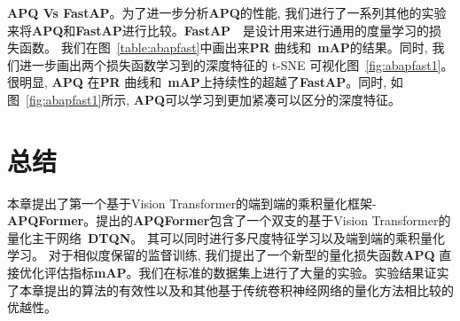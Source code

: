 \textbf{APQ Vs FastAP}。为了进一步分析\textbf{APQ}的性能, 我们进行了一系列其他的实验来将\textbf{APQ}和\textbf{FastAP}进行比较。\textbf{FastAP}~~\cite{cakir2019deep}是设计用来进行通用的度量学习的损失函数。 我们在图~\ref{table:abapfast}中画出来\textbf{PR} 曲线和~\textbf{mAP}的结果。同时, 我们进一步画出两个损失函数学习到的深度特征的 t-SNE 可视化图~\ref{fig:abapfast1}。很明显, \textbf{APQ} 在\textbf{PR} 曲线和~\textbf{mAP}上持续性的超越了\textbf{FastAP}。同时, 如图~\ref{fig:abapfast1}所示, \textbf{APQ}可以学习到更加紧凑可以区分的深度特征。 
\section{总结}
本章提出了第一个基于Vision Transformer的端到端的乘积量化框架-\textbf{APQFormer}。提出的\textbf{APQFormer}包含了一个双支的基于Vision Transformer的量化主干网络~\textbf{DTQN}。 其可以同时进行多尺度特征学习以及端到端的乘积量化学习。 对于相似度保留的监督训练, 我们提出了一个新型的量化损失函数\textbf{APQ} 直接优化评估指标\textbf{mAP}。我们在标准的数据集上进行了大量的实验。实验结果证实了本章提出的算法的有效性以及和其他基于传统卷积神经网络的量化方法相比较的优越性。